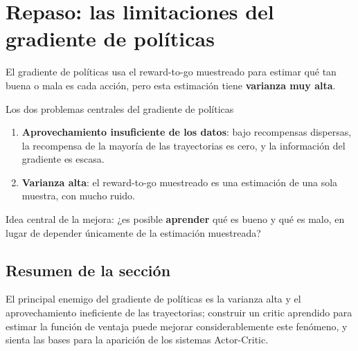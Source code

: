 \section{Repaso: las limitaciones del gradiente de políticas}

El gradiente de políticas usa el reward-to-go muestreado para estimar qué tan buena o mala es cada acción, pero esta estimación tiene \textbf{varianza muy alta}.

\begin{warningbox}{Los dos problemas centrales del gradiente de políticas}
\begin{enumerate}
    \item \textbf{Aprovechamiento insuficiente de los datos}: bajo recompensas dispersas, la recompensa de la mayoría de las trayectorias es cero, y la información del gradiente es escasa.
    \item \textbf{Varianza alta}: el reward-to-go muestreado es una estimación de una sola muestra, con mucho ruido.
\end{enumerate}
\end{warningbox}

Idea central de la mejora: ¿es posible \textbf{aprender} qué es bueno y qué es malo, en lugar de depender únicamente de la estimación muestreada?

\subsection{Resumen de la sección}

El principal enemigo del gradiente de políticas es la varianza alta y el aprovechamiento ineficiente de las trayectorias; construir un critic aprendido para estimar la función de ventaja puede mejorar considerablemente este fenómeno, y sienta las bases para la aparición de los sistemas Actor-Critic.

